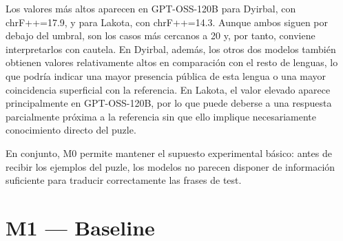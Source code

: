 Los valores más altos aparecen en GPT-OSS-120B para Dyirbal, con chrF++=17.9, y para Lakota, con chrF++=14.3. Aunque ambos siguen por debajo del umbral, son los casos más cercanos a 20 y, por tanto, conviene interpretarlos con cautela. En Dyirbal, además, los otros dos modelos también obtienen valores relativamente altos en comparación con el resto de lenguas, lo que podría indicar una mayor presencia pública de esta lengua o una mayor coincidencia superficial con la referencia. En Lakota, el valor elevado aparece principalmente en GPT-OSS-120B, por lo que puede deberse a una respuesta parcialmente próxima a la referencia sin que ello implique necesariamente conocimiento directo del puzle.

En conjunto, M0 permite mantener el supuesto experimental básico: antes de recibir los ejemplos del puzle, los modelos no parecen disponer de información suficiente para traducir correctamente las frases de test.


\section{M1 — Baseline}
\label{sec:resultados_m1}

